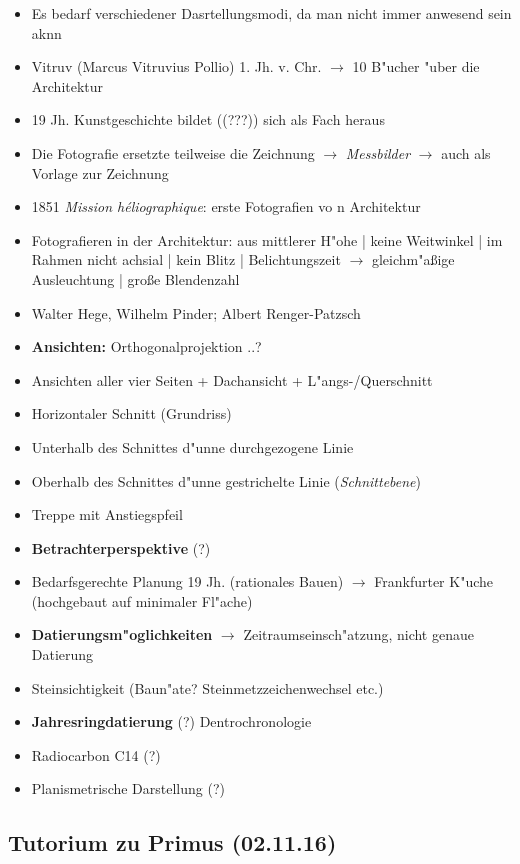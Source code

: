 \documentclass[]{scrartcl}
\begin{document}
\begin{itemize}
  \item Es bedarf verschiedener Dasrtellungsmodi, da man nicht immer anwesend sein aknn
  \item Vitruv (Marcus Vitruvius Pollio) 1. Jh. v. Chr. $\rightarrow$ 10 B"ucher "uber die Architektur
  \item 19 Jh. Kunstgeschichte bildet ({\color{red}(???)}) sich als Fach heraus
  \item Die Fotografie ersetzte teilweise die Zeichnung $\rightarrow$ \emph{Messbilder} $\rightarrow$ auch als Vorlage zur Zeichnung
  \item 1851 \emph{Mission h\'{e}liographique}: erste Fotografien vo n Architektur
  \item Fotografieren in der Architektur: aus mittlerer H"ohe | keine Weitwinkel | im Rahmen nicht achsial | kein Blitz | Belichtungszeit $\rightarrow$ gleichm"a\ss ige Ausleuchtung | gro\ss e Blendenzahl
  \item Walter Hege, Wilhelm Pinder; Albert Renger-Patzsch
  \item \textbf{Ansichten:} {\color{red}Orthogonalprojektion ..?} 
  \item Ansichten aller vier Seiten + Dachansicht + L"angs-/Querschnitt
  \item Horizontaler Schnitt (Grundriss)
  \item Unterhalb des Schnittes d"unne durchgezogene Linie
  \item Oberhalb des Schnittes d"unne gestrichelte Linie (\emph{Schnittebene})
  \item Treppe mit Anstiegspfeil
  \item \textbf{Betrachterperspektive} {\color{red}(?)} 
  \item Bedarfsgerechte Planung 19 Jh. (rationales Bauen) $\rightarrow$ Frankfurter K"uche (hochgebaut auf minimaler Fl"ache)
  \item \textbf{Datierungsm"oglichkeiten} $\rightarrow$ Zeitraumseinsch"atzung, nicht genaue Datierung
  \item Steinsichtigkeit (Baun"ate? Steinmetzzeichenwechsel etc.) 
  \item \textbf{Jahresringdatierung} {\color{red}(?)} Dentrochronologie
  \item Radiocarbon C14 {\color{red}(?)}
  \item Planismetrische Darstellung {\color{red}(?)}
\end{itemize}


\subsection{Tutorium zu Primus (02.11.16)}
\end{document}
